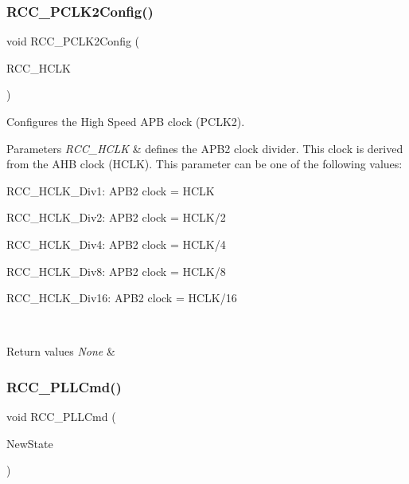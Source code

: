 \subsubsection{\texorpdfstring{RCC\_PCLK2Config()}{RCC\_PCLK2Config()}}
{\footnotesize\ttfamily void R\+C\+C\+\_\+\+P\+C\+L\+K2\+Config (\begin{DoxyParamCaption}\item[{uint32\+\_\+t}]{R\+C\+C\+\_\+\+H\+C\+LK }\end{DoxyParamCaption})}



Configures the High Speed A\+PB clock (P\+C\+L\+K2). 


\begin{DoxyParams}{Parameters}
{\em R\+C\+C\+\_\+\+H\+C\+LK} & defines the A\+P\+B2 clock divider. This clock is derived from the A\+HB clock (H\+C\+LK). This parameter can be one of the following values\+: \begin{DoxyItemize}
\item R\+C\+C\+\_\+\+H\+C\+L\+K\+\_\+\+Div1\+: A\+P\+B2 clock = H\+C\+LK \item R\+C\+C\+\_\+\+H\+C\+L\+K\+\_\+\+Div2\+: A\+P\+B2 clock = H\+C\+L\+K/2 \item R\+C\+C\+\_\+\+H\+C\+L\+K\+\_\+\+Div4\+: A\+P\+B2 clock = H\+C\+L\+K/4 \item R\+C\+C\+\_\+\+H\+C\+L\+K\+\_\+\+Div8\+: A\+P\+B2 clock = H\+C\+L\+K/8 \item R\+C\+C\+\_\+\+H\+C\+L\+K\+\_\+\+Div16\+: A\+P\+B2 clock = H\+C\+L\+K/16 \end{DoxyItemize}
\\
\hline
\end{DoxyParams}

\begin{DoxyRetVals}{Return values}
{\em None} & \\
\hline
\end{DoxyRetVals}
\mbox{\label{group___r_c_c___exported___functions_ga84dee53c75e58fdb53571716593c2272}} 
\subsubsection{\texorpdfstring{RCC\_PLLCmd()}{RCC\_PLLCmd()}}
{\footnotesize\ttfamily void R\+C\+C\+\_\+\+P\+L\+L\+Cmd (\begin{DoxyParamCaption}\item[{\mbox{\hyperlink{group___exported__types_gac9a7e9a35d2513ec15c3b537aaa4fba1}{Functional\+State}}}]{New\+State }\end{DoxyParamCaption})}




